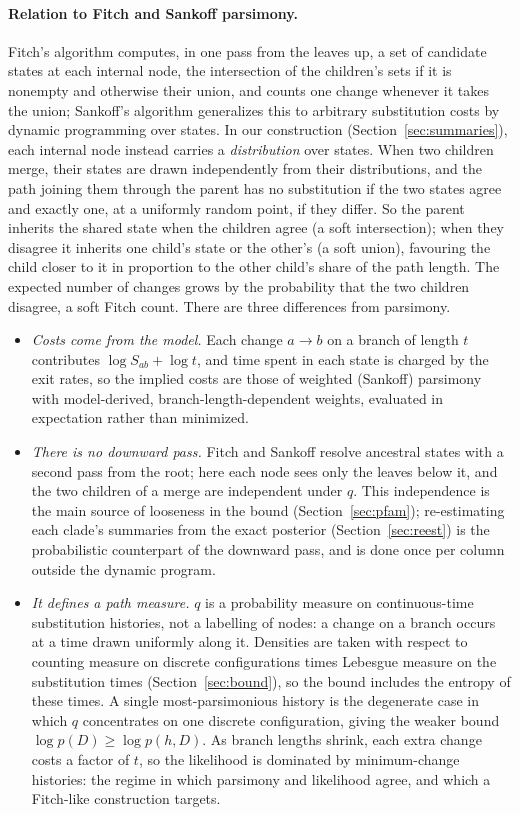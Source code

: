 \documentclass[11pt]{article}
\begin{document}
\paragraph{Relation to Fitch and Sankoff parsimony.} Fitch's algorithm
\citep{Fitch1971} computes, in one pass from the leaves up, a set of candidate
states at each internal node, the intersection of the children's sets if it is
nonempty and otherwise their union, and counts one change whenever it takes
the union; Sankoff's algorithm \citep{Sankoff1975} generalizes this to
arbitrary substitution costs by dynamic programming over states. In our
construction (Section~\ref{sec:summaries}), each internal node instead carries
a \emph{distribution} over states. When two children merge, their states
are drawn independently from their distributions, and the path joining them
through the parent has no substitution if the two states agree and exactly one,
at a uniformly random point, if they differ. So the parent inherits the shared
state when the children agree (a soft intersection); when they disagree it
inherits one child's state or the other's (a soft union), favouring the child
closer to it in proportion to the other child's share of the path length. The
expected number of changes grows by the probability that the two children
disagree, a soft Fitch count. There are three differences from parsimony.
\begin{itemize}
\item \emph{Costs come from the model.} Each change $a\to b$ on a branch of
  length $t$ contributes $\log S_{ab}+\log t$, and time spent in each state is
  charged by the exit rates, so the implied costs are those of weighted
  (Sankoff) parsimony with model-derived, branch-length-dependent weights,
  evaluated in expectation rather than minimized.
\item \emph{There is no downward pass.} Fitch and Sankoff resolve ancestral
  states with a second pass from the root; here each node sees only the leaves
  below it, and the two children of a merge are independent under $q$. This
  independence is the main source of looseness in the bound
  (Section~\ref{sec:pfam}); re-estimating each clade's summaries from the
  exact posterior (Section~\ref{sec:reest}) is the probabilistic counterpart of
  the downward pass, and is done once per column outside the dynamic program.
\item \emph{It defines a path measure.} $q$ is a probability measure on
  continuous-time substitution histories, not a labelling of nodes: a change
  on a branch occurs at a time drawn uniformly along it. Densities are taken
  with respect to counting measure on discrete configurations times Lebesgue
  measure on the substitution times (Section~\ref{sec:bound}), so the bound
  includes the entropy of these times. A single most-parsimonious history is
  the degenerate case in which $q$ concentrates on one discrete configuration,
  giving the weaker bound $\log p(D)\ge\log p(h,D)$. As branch lengths shrink,
  each extra change costs a factor of $t$, so the likelihood is dominated by
  minimum-change histories: the regime in which parsimony and likelihood agree,
  and which a Fitch-like construction targets.
\end{itemize}
\end{document}
